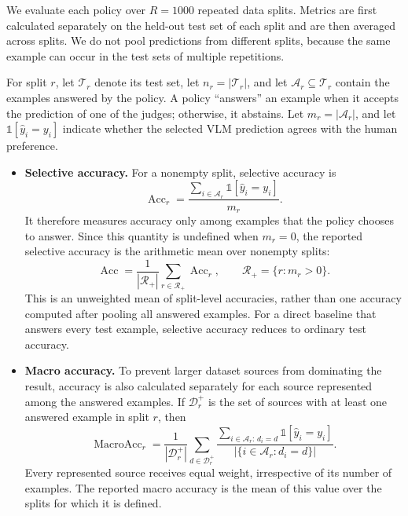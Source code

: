 \documentclass[11pt]{article}
\begin{document}
We evaluate each policy over $R=1000$ repeated data splits. Metrics are first
calculated separately on the held-out test set of each split and are then
averaged across splits. We do not pool predictions from different splits,
because the same example can occur in the test sets of multiple repetitions.

For split $r$, let $\mathcal{T}_r$ denote its test set, let
$n_r = |\mathcal{T}_r|$, and let $\mathcal{A}_r \subseteq \mathcal{T}_r$
contain the examples answered by the policy. A policy ``answers'' an example
when it accepts the prediction of one of the judges; otherwise, it abstains.
Let $m_r = |\mathcal{A}_r|$, and let
$\mathbb{1}[\widehat{y}_i=y_i]$ indicate whether the selected VLM prediction
agrees with the human preference.

\begin{itemize}
    \item \textbf{Selective accuracy.}
    For a nonempty split, selective accuracy is
    \[
        \operatorname{Acc}_r =
        \frac{
            \sum_{i\in\mathcal{A}_r}
            \mathbb{1}[\widehat{y}_i=y_i]
        }{m_r}.
    \]
    It therefore measures accuracy only among examples that the policy chooses
    to answer. Since this quantity is undefined when $m_r=0$, the reported
    selective accuracy is the arithmetic mean over nonempty splits:
    \[
        \operatorname{Acc} =
        \frac{1}{|\mathcal{R}_{+}|}
        \sum_{r\in\mathcal{R}_{+}}\operatorname{Acc}_r,
        \qquad
        \mathcal{R}_{+}=\{r:m_r>0\}.
    \]
    This is an unweighted mean of split-level accuracies, rather than one
    accuracy computed after pooling all answered examples. For a direct
    baseline that answers every test example, selective accuracy reduces to
    ordinary test accuracy.

    \item \textbf{Macro accuracy.}
    To prevent larger dataset sources from dominating the result, accuracy is
    also calculated separately for each source represented among the answered
    examples. If $\mathcal{D}_r^{+}$ is the set of sources with at least one
    answered example in split $r$, then
    \[
        \operatorname{MacroAcc}_r =
        \frac{1}{|\mathcal{D}_r^{+}|}
        \sum_{d\in\mathcal{D}_r^{+}}
        \frac{
            \sum_{i\in\mathcal{A}_r:\,d_i=d}
            \mathbb{1}[\widehat{y}_i=y_i]
        }{
            |\{i\in\mathcal{A}_r:d_i=d\}|
        }.
    \]
    Every represented source receives equal weight, irrespective of its number
    of examples. The reported macro accuracy is the mean of this value over
    the splits for which it is defined.


\end{itemize}
\end{document}

